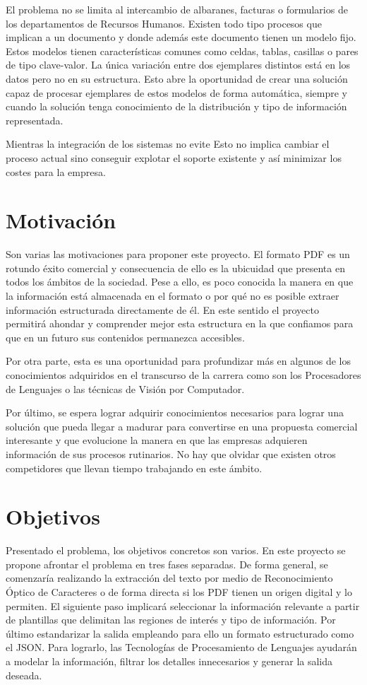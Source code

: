 El problema no se limita al intercambio de albaranes, facturas o formularios de los departamentos de Recursos Humanos. Existen todo tipo procesos que implican a un documento y donde además este documento tienen un modelo fijo. Estos modelos tienen características comunes como celdas, tablas, casillas o pares de tipo clave-valor. La única variación entre dos ejemplares distintos está en los datos pero no en su estructura. Esto abre la oportunidad de crear una solución capaz de procesar ejemplares de estos modelos de forma automática, siempre y cuando la solución tenga conocimiento de la distribución y tipo de información representada. 

Mientras la integración de los sistemas no evite Esto no implica cambiar el proceso actual sino conseguir explotar el soporte existente y así minimizar los costes para la empresa. 


\section{Motivación}

Son varias las motivaciones para proponer este proyecto. El formato PDF es un rotundo éxito comercial y consecuencia de ello es la ubicuidad que presenta en todos los ámbitos de la sociedad. Pese a ello, es poco conocida la manera en que la información está almacenada en el formato o por qué no es posible extraer información estructurada directamente de él. En este sentido el proyecto permitirá ahondar y comprender mejor esta estructura en la que confiamos para que en un futuro sus contenidos permanezca accesibles.

Por otra parte, esta es una oportunidad para profundizar más en algunos de los conocimientos adquiridos en el transcurso de la carrera como son los Procesadores de Lenguajes o las técnicas de Visión por Computador.

Por último, se espera lograr adquirir conocimientos necesarios para lograr una solución que pueda llegar a madurar para convertirse en una propuesta comercial interesante y que evolucione la manera en que las empresas adquieren información de sus procesos rutinarios. No hay que olvidar que existen otros competidores que llevan tiempo trabajando en este ámbito.

\section{Objetivos} 

Presentado el problema, los objetivos concretos son varios. En este proyecto se propone afrontar el problema en tres fases separadas. De forma general, se comenzaría realizando la extracción del texto por medio de Reconocimiento Óptico de Caracteres o de forma directa si los PDF tienen un origen digital y lo permiten. El siguiente paso implicará seleccionar la información relevante a partir de plantillas que delimitan las regiones de interés y tipo de información. Por último estandarizar la salida empleando para ello un formato estructurado como el JSON. Para lograrlo, las Tecnologías de Procesamiento de Lenguajes ayudarán a modelar la información, filtrar los detalles innecesarios y generar la salida deseada.

